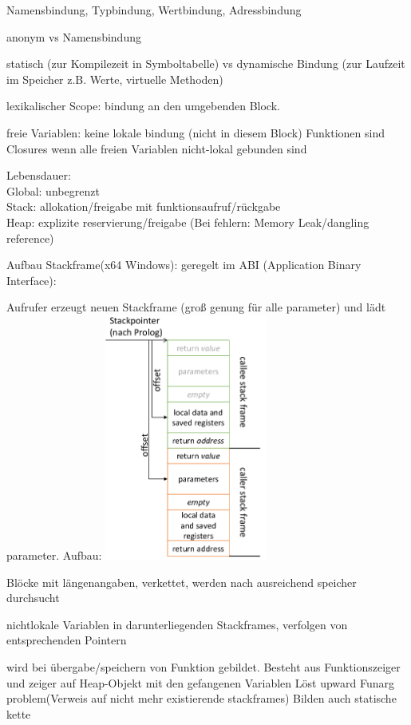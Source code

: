Namensbindung, Typbindung, Wertbindung, Adressbindung

anonym vs Namensbindung

statisch (zur Kompilezeit in Symboltabelle) vs dynamische Bindung (zur Laufzeit im Speicher z.B. Werte, virtuelle Methoden)

lexikalischer Scope: bindung an den umgebenden Block.

freie Variablen: keine lokale bindung (nicht in diesem Block)
Funktionen sind Closures wenn alle freien Variablen nicht-lokal gebunden sind

Lebensdauer: \\
Global: unbegrenzt\\
Stack: allokation/freigabe mit funktionsaufruf/rückgabe\\
Heap: explizite reservierung/freigabe (Bei fehlern: Memory Leak/dangling reference)

Aufbau Stackframe(x64 Windows): geregelt im ABI (Application Binary Interface):

Aufrufer erzeugt neuen Stackframe (groß genung für alle parameter) und lädt parameter. Aufbau:
\includegraphics[angle=90,width=0.4\textwidth]{stack}

Blöcke mit längenangaben, verkettet, werden nach ausreichend speicher durchsucht

 nichtlokale Variablen in darunterliegenden Stackframes, verfolgen von entsprechenden Pointern

 wird bei übergabe/speichern von Funktion gebildet. Besteht aus Funktionszeiger und zeiger auf Heap-Objekt mit den gefangenen Variablen
Löst upward Funarg problem(Verweis auf nicht mehr existierende stackframes)
Bilden auch statische kette